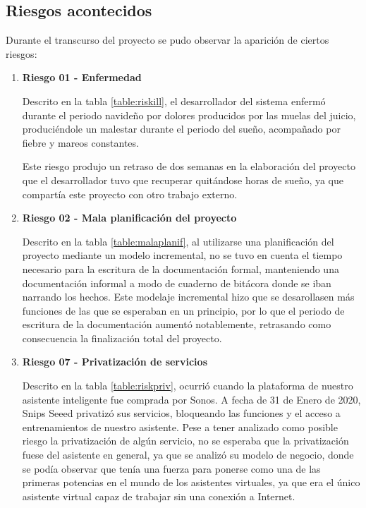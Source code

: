 \subsection{Riesgos acontecidos}

Durante el transcurso del proyecto se pudo observar la aparición de ciertos riesgos:

\begin{enumerate}

\item \textbf{Riesgo 01 - Enfermedad}

Descrito en la tabla \ref{table:riskill}, el desarrollador del sistema enfermó durante el periodo navideño por dolores producidos por las muelas del juicio, produciéndole un malestar durante el periodo del sueño, acompañado por fiebre y mareos constantes.

Este riesgo produjo un retraso de dos semanas en la elaboración del proyecto que el desarrollador tuvo que recuperar quitándose horas de sueño, ya que compartía este proyecto con otro trabajo externo.

\item \textbf{Riesgo 02 - Mala planificación del proyecto}

Descrito en la tabla \ref{table:malaplanif}, al utilizarse una planificación del proyecto mediante un modelo incremental, no se tuvo en cuenta el tiempo necesario para la escritura de la documentación formal, manteniendo una documentación informal a modo de cuaderno de bitácora donde se iban narrando los hechos.
Este modelaje incremental hizo que se desarollasen más funciones de las que se esperaban en un principio, por lo que el periodo de escritura de la documentación aumentó notablemente, retrasando como consecuencia la finalización total del proyecto.

    \item \textbf{Riesgo 07 - Privatización de servicios}
    
Descrito en la tabla \ref{table:riskpriv}, ocurrió cuando la plataforma de nuestro asistente inteligente fue comprada por Sonos. 
A fecha de 31 de Enero de 2020, Snips Seeed privatizó sus servicios, bloqueando las funciones y el acceso a entrenamientos de nuestro asistente. Pese a tener analizado como posible riesgo la privatización de algún servicio, no se esperaba que la privatización fuese del asistente en general, ya que se analizó su modelo de negocio, donde se podía observar que tenía una fuerza para ponerse como una de las primeras potencias en el mundo de los asistentes virtuales, ya que era el único asistente virtual capaz de trabajar sin una conexión a Internet. 


\end{enumerate}
